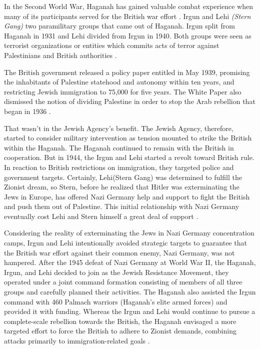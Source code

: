 In the Second World War, Haganah has gained valuable combat experience when many of its participants served for the British war effort \citep{Pappe2006}. Irgun and Lehi \textit{(Stern Gang)} two paramilitary groups that came out of Haganah. Irgun split from Haganah in 1931 and Lehi divided from Irgun in 1940\citep{Shlaim2014}. Both groups were seen as terrorist organizations or entities which commits acts of terror against Palestinians and British authorities \citep{Bell1976}.   


The British government released a policy paper entitled  in May 1939, promising the inhabitants of Palestine statehood and autonomy within ten years, and restricting Jewish immigration to 75,000 for five years. The White Paper also dismissed the notion of dividing Palestine in order to stop the Arab rebellion that began in 1936 \citep{Morris2004, Fenby2018}.

That wasn't in the Jewish Agency's benefit. The Jewish Agency, therefore, started to consider military intervention as tension mounted to strike the British within the Haganah. The Haganah continued to remain with the British in cooperation. But in 1944, the Irgun and Lehi started a revolt toward British rule. In reaction to British restrictions on immigration, they targeted police and government targets.
Certainly, Lehi(Stern Gang) was determined to fulfill the Zionist dream, so Stern, before he realized that Hitler was exterminating the Jews in Europe, has offered Nazi Germany help and support to fight the British and push them out of Palestine. This initial relationship with Nazi Germany eventually cost Lehi and Stern himself a great deal of support \citep{Shlaim2014, Heller1995, Grob-Fitzgibbon2011}. 

Considering the reality of exterminating the Jews in Nazi Germany concentration camps, Irgun and Lehi intentionally avoided strategic targets to guarantee that the British war effort against their common enemy, Nazi Germany, was not hampered. After the 1945 defeat of Nazi Germany at World War II, the Haganah, Irgun, and Lehi decided to join as the Jewish Resistance Movement, they operated under a joint command formation consisting of members of all three groups and carefully planned their activities. The Haganah also assisted the Irgun command with 460 Palmach warriors (Haganah's elite armed forces) and provided it with funding. Whereas the Irgun and Lehi would continue to pursue a complete-scale rebellion towards the British, the Haganah envisaged a more targeted effort to force the British to adhere to Zionist demands, combining attacks primarily to immigration-related goals \citep{Bell1976, Shlaim2014}.

